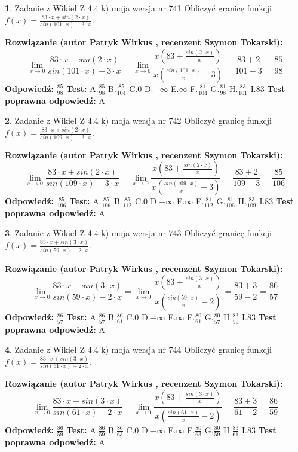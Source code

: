 \documentclass[12pt, a4paper]{article}
\theoremstyle{definition} %
\newtheorem{zad}{}
\newcommand{\zadStart}[1]{\begin{zad}#1\newline}
\newcommand{\zadStop}{\end{zad}}
\newcommand{\rozwStart}[2]{\noindent \textbf{Rozwiązanie (autor #1 , recenzent #2): }\newline}
\newcommand{\rozwStop}{\newline}
\newcommand{\odpStart}{\noindent \textbf{Odpowiedź:}\newline}
\newcommand{\odpStop}{\newline}
\newcommand{\testStart}{\noindent \textbf{Test:}\newline}
\newcommand{\testStop}{\newline}
\newcommand{\kluczStart}{\noindent \textbf{Test poprawna odpowiedź:}\newline}
\newcommand{\kluczStop}{\newline}
\begin{document}
\zadStart{Zadanie z Wikieł Z 4.4 k) moja wersja nr 741}
Obliczyć granicę funkcji $f(x)=\frac{83\cdot x +sin(2\cdot x)}{sin(101\cdot x) -3\cdot x}$.
\zadStop
\rozwStart{Patryk Wirkus}{Szymon Tokarski}
$$\lim\limits_{x\to 0}\frac{83\cdot x +sin(2\cdot x)}{sin(101\cdot x) -3\cdot x}
=\lim\limits_{x\to 0}\frac{x(83+\frac{sin(2\cdot x)}{x})}{x(\frac{sin(101\cdot x)}{x}-3)}
=\frac{83+2}{101-3} = \frac{85}{98}$$
\rozwStop
\odpStart
$\frac{85}{98}$
\odpStop
\testStart
A.$\frac{85}{98}$
B.$\frac{85}{104}$
C.$0$
D.$-\infty$
E.$\infty$
F.$\frac{81}{104}$
G.$\frac{81}{98}$
H.$\frac{83}{101}$
I.$83$
\testStop
\kluczStart
A
\kluczStop



\zadStart{Zadanie z Wikieł Z 4.4 k) moja wersja nr 742}
Obliczyć granicę funkcji $f(x)=\frac{83\cdot x +sin(2\cdot x)}{sin(109\cdot x) -3\cdot x}$.
\zadStop
\rozwStart{Patryk Wirkus}{Szymon Tokarski}
$$\lim\limits_{x\to 0}\frac{83\cdot x +sin(2\cdot x)}{sin(109\cdot x) -3\cdot x}
=\lim\limits_{x\to 0}\frac{x(83+\frac{sin(2\cdot x)}{x})}{x(\frac{sin(109\cdot x)}{x}-3)}
=\frac{83+2}{109-3} = \frac{85}{106}$$
\rozwStop
\odpStart
$\frac{85}{106}$
\odpStop
\testStart
A.$\frac{85}{106}$
B.$\frac{85}{112}$
C.$0$
D.$-\infty$
E.$\infty$
F.$\frac{81}{112}$
G.$\frac{81}{106}$
H.$\frac{83}{109}$
I.$83$
\testStop
\kluczStart
A
\kluczStop



\zadStart{Zadanie z Wikieł Z 4.4 k) moja wersja nr 743}
Obliczyć granicę funkcji $f(x)=\frac{83\cdot x +sin(3\cdot x)}{sin(59\cdot x) -2\cdot x}$.
\zadStop
\rozwStart{Patryk Wirkus}{Szymon Tokarski}
$$\lim\limits_{x\to 0}\frac{83\cdot x +sin(3\cdot x)}{sin(59\cdot x) -2\cdot x}
=\lim\limits_{x\to 0}\frac{x(83+\frac{sin(3\cdot x)}{x})}{x(\frac{sin(59\cdot x)}{x}-2)}
=\frac{83+3}{59-2} = \frac{86}{57}$$
\rozwStop
\odpStart
$\frac{86}{57}$
\odpStop
\testStart
A.$\frac{86}{57}$
B.$\frac{86}{61}$
C.$0$
D.$-\infty$
E.$\infty$
F.$\frac{80}{61}$
G.$\frac{80}{57}$
H.$\frac{83}{59}$
I.$83$
\testStop
\kluczStart
A
\kluczStop



\zadStart{Zadanie z Wikieł Z 4.4 k) moja wersja nr 744}
Obliczyć granicę funkcji $f(x)=\frac{83\cdot x +sin(3\cdot x)}{sin(61\cdot x) -2\cdot x}$.
\zadStop
\rozwStart{Patryk Wirkus}{Szymon Tokarski}
$$\lim\limits_{x\to 0}\frac{83\cdot x +sin(3\cdot x)}{sin(61\cdot x) -2\cdot x}
=\lim\limits_{x\to 0}\frac{x(83+\frac{sin(3\cdot x)}{x})}{x(\frac{sin(61\cdot x)}{x}-2)}
=\frac{83+3}{61-2} = \frac{86}{59}$$
\rozwStop
\odpStart
$\frac{86}{59}$
\odpStop
\testStart
A.$\frac{86}{59}$
B.$\frac{86}{63}$
C.$0$
D.$-\infty$
E.$\infty$
F.$\frac{80}{63}$
G.$\frac{80}{59}$
H.$\frac{83}{61}$
I.$83$
\testStop
\kluczStart
A
\kluczStop
\end{document}
